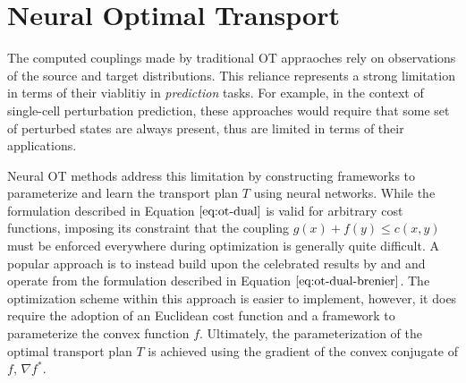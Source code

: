 \section{Neural Optimal Transport}
The computed couplings made by traditional OT appraoches rely on observations of the source and target distributions.
This reliance represents a strong limitation in terms of their viablitiy in \emph{prediction} tasks.
For example, in the context of single-cell perturbation prediction,
these approaches would require that some set of perturbed states are always present,
thus are limited in terms of their applications.

Neural OT methods address this limitation by constructing frameworks to parameterize and learn the transport plan $T$ using neural networks.
While the formulation described in Equation $\ref{eq:ot-dual}$ is valid for arbitrary cost functions,
imposing its constraint that the coupling $g(x) + f(y) \leq c(x, y)$ must be enforced everywhere during optimization is generally quite difficult.
A popular approach is to instead build upon the celebrated results by \citet{knott1984optimal} and \citet{brenier1991polar}
and operate from the formulation described in Equation $\ref{eq:ot-dual-brenier}$.
The optimization scheme within this approach is easier to implement, however, it does require
the adoption of an Euclidean cost function and a framework to parameterize the convex function $f$.
Ultimately, the parameterization of the optimal transport plan $T$ is achieved using the gradient of the convex conjugate of $f$, $\nabla f^*$.

